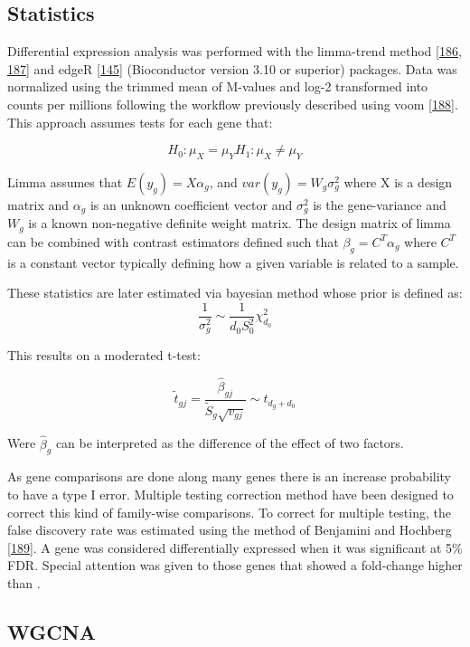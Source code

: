 \documentclass[
  12pt,
  a4paper,
  twoside,
  openright]{book}
\begin{document}
\hypertarget{statistics}{%
\subsection{Statistics}\label{statistics}}

Differential expression analysis was performed with the limma-trend method {[}\protect\hyperlink{ref-ritchie2015}{186}, \protect\hyperlink{ref-law2014}{187}{]} and edgeR {[}\protect\hyperlink{ref-mccarthy2012}{145}{]} (Bioconductor version 3.10 or superior) packages.
Data was normalized using the trimmed mean of M-values and log-2 transformed into counts per millions following the workflow previously described using voom {[}\protect\hyperlink{ref-law2018}{188}{]}.
This approach assumes tests for each gene that:

\[
H_0 : \mu_{X} = \mu_{Y}
H_1 : \mu_{X} \neq \mu_{Y}
\]

Limma assumes that \(E(y_g) = X \alpha_g\), and \(var(y_g) = W_g \sigma_g^2\) where X is a design matrix and \(\alpha_g\) is an unknown coefficient vector and \(\sigma_g^2\) is the gene-variance and \(W_g\) is a known non-negative definite weight matrix.
The design matrix of limma can be combined with contrast estimators defined such that \(\beta_g = C^T \alpha_g\) where \(C^T\) is a constant vector typically defining how a given variable is related to a sample.

These statistics are later estimated via bayesian method whose prior is defined as:
\[
\dfrac{1}{\sigma_g^2} \sim \dfrac{1}{d_0 S_0^2} \chi_{d_0}^2
\]

This results on a moderated t-test:

\[
\widetilde t_{gj} = \dfrac{\hat \beta_{gj}}{\tilde S_g \sqrt{v_{gj}}} \sim t_{d_g + d_0}
\]

Were \(\hat \beta_g\) can be interpreted as the difference of the effect of two factors.

As gene comparisons are done along many genes there is an increase probability to have a type I error.
Multiple testing correction method have been designed to correct this kind of family-wise comparisons.
To correct for multiple testing, the false discovery rate was estimated using the method of Benjamini and Hochberg {[}\protect\hyperlink{ref-yoavbenjamini}{189}{]}.
A gene was considered differentially expressed when it was significant at 5\% FDR.
Special attention was given to those genes that showed a fold-change higher than \textbar.

\hypertarget{wgcna}{%
\subsection{WGCNA}\label{wgcna}}
\end{document}
